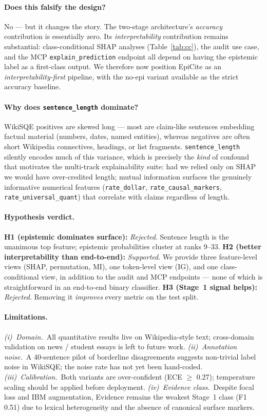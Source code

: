 \documentclass[conference]{IEEEtran}
\begin{document}
\paragraph{Does this falsify the design?}
No --- but it changes the story. The two-stage architecture's
\emph{accuracy} contribution is essentially zero. Its
\emph{interpretability} contribution remains substantial:
class-conditional SHAP analyses (Table~\ref{tab:cc}), the audit use case,
and the MCP \texttt{explain\_prediction} endpoint all depend on having
the epistemic label as a first-class output. We therefore now position
EpiCite as an \emph{interpretability-first} pipeline, with the no-epi
variant available as the strict accuracy baseline.

\paragraph{Why does \texttt{sentence\_length} dominate?}
WikiSQE positives are skewed long --- most are claim-like sentences
embedding factual material (numbers, dates, named entities), whereas
negatives are often short Wikipedia connectives, headings, or list
fragments. \texttt{sentence\_length} silently encodes much of this
variance, which is precisely the \emph{kind} of confound that motivates
the multi-track explainability suite: had we relied only on SHAP we would
have over-credited length; mutual information surfaces the genuinely
informative numerical features
(\texttt{rate\_dollar}, \texttt{rate\_causal\_markers},
\texttt{rate\_universal\_quant}) that correlate with claims regardless
of length.

\paragraph{Hypothesis verdict.}
\textbf{H1 (epistemic dominates surface):} \emph{Rejected}. Sentence
length is the unanimous top feature; epistemic probabilities cluster at
ranks 9--33.
\textbf{H2 (better interpretability than end-to-end):} \emph{Supported}.
We provide three feature-level views (SHAP, permutation, MI), one
token-level view (IG), and one class-conditional view, in addition to
the audit and MCP endpoints --- none of which is straightforward in an
end-to-end binary classifier.
\textbf{H3 (Stage~1 signal helps):} \emph{Rejected}. Removing it
\emph{improves} every metric on the test split.

\paragraph{Limitations.}
\textit{(i)~Domain.}~All quantitative results live on Wikipedia-style
text; cross-domain validation on news / student essays is left to future
work. \textit{(ii)~Annotation noise.}~A 40-sentence pilot of borderline
disagreements suggests non-trivial label noise in WikiSQE; the noise
rate has not yet been hand-coded. \textit{(iii)~Calibration.}~Both
variants are over-confident (ECE $\geq$ 0.27); temperature scaling
should be applied before deployment. \textit{(iv)~Evidence
class.}~Despite focal loss and IBM augmentation, Evidence remains the
weakest Stage~1 class (F1 0.51) due to lexical heterogeneity and the
absence of canonical surface markers.
\end{document}
